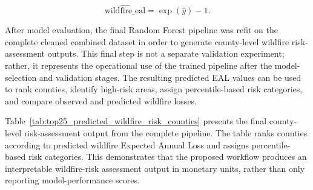 \begin{equation}
\widehat{\mathrm{wildfire\_eal}} = \exp(\hat{y}) - 1.
\end{equation}

After model evaluation, the final Random Forest pipeline was refit on the complete cleaned combined dataset in order to generate county-level wildfire risk-assessment outputs. This final step is not a separate validation experiment; rather, it represents the operational use of the trained pipeline after the model-selection and validation stages. The resulting predicted EAL values can be used to rank counties, identify high-risk areas, assign percentile-based risk categories, and compare observed and predicted wildfire losses.

Table~\ref{tab:top25_predicted_wildfire_risk_counties} presents the final county-level risk-assessment output from the complete pipeline. The table ranks counties according to predicted wildfire Expected Annual Loss and assigns percentile-based risk categories. This demonstrates that the proposed workflow produces an interpretable wildfire-risk assessment output in monetary units, rather than only reporting model-performance scores.


